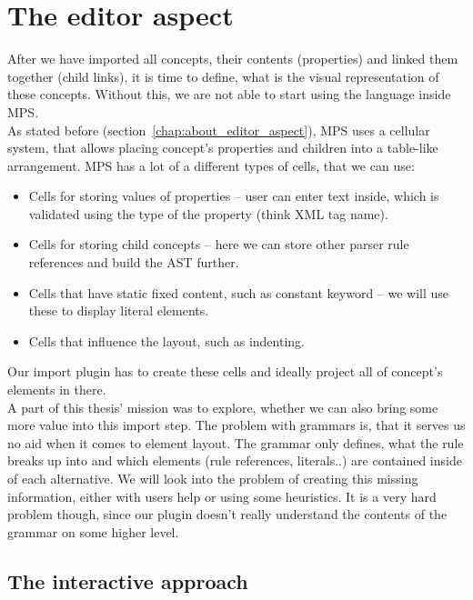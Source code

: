 \section{The editor aspect}
\label{chap:editor_aspect}

After we have imported all concepts, their contents (properties) and linked them together (child links), it is time to define, what is the visual representation of these concepts.
Without this, we are not able to start using the language inside MPS.
\\

As stated before (section~\ref{chap:about_editor_aspect}), MPS uses a cellular system, that allows placing concept's properties and children into a table-like arrangement.
MPS has a lot of a different types of cells, that we can use:

\begin{itemize}
	\item Cells for storing values of properties -- user can enter text inside, which is validated using the type of the property (think XML tag name).
	
	\item Cells for storing child concepts -- here we can store other parser rule references and build the AST further.
	
	\item Cells that have static fixed content, such as constant keyword -- we will use these to display literal elements.
	
	\item Cells that influence the layout, such as indenting.
\end{itemize}

Our import plugin has to create these cells and ideally project all of concept's elements in there.
\\

A part of this thesis' mission was to explore, whether we can also bring some more value into this import step.
The problem with grammars is, that it serves us no aid when it comes to element layout.
The grammar only defines, what the rule breaks up into and which elements (rule references, literals..) are contained inside of each alternative.
We will look into the problem of creating this missing information, either with users help or using some heuristics.
It is a very hard problem though, since our plugin doesn't really understand the contents of the grammar on some higher level.

\subsection{The interactive approach}

